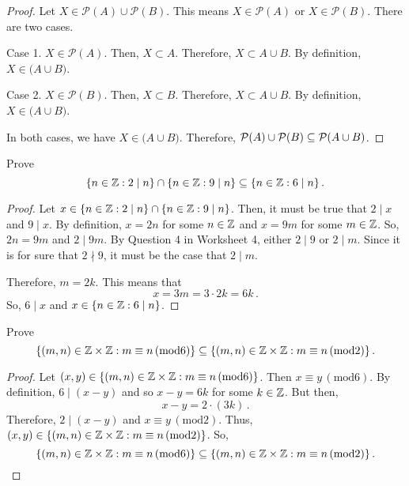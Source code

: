 \documentclass[12pt]{amsart}
\begin{document}
\begin{proof}
	Let $X \in \mathcal{P}(A) \cup \mathcal{P}(B)$.
	This means $X \in \mathcal{P}(A)$ or $X \in \mathcal{P}(B)$.
	There are two cases.

	Case 1. $X \in \mathcal{P}(A)$. Then, $X \subset A$.
	Therefore, $X \subset A \cup B$.
	By definition, $X \in \mathcal(A \cup B)$.

	Case 2. $X \in \mathcal{P}(B)$. Then, $X \subset B$.
	Therefore, $X \subset A \cup B$.
	By definition, $X \in \mathcal(A \cup B)$.

	In both cases, we have $X \in \mathcal(A \cup B)$.
	Therefore,
	$ \mathcal{P}(A) \cup \mathcal{P}(B) \subseteq \mathcal{P}(A \cup B)$.
\end{proof}

\begin{problem}[Exercise 3.21]
Prove
\begin{equation*}
	\{ n\in \mathbb{Z} : 2 \mid n \} \cap \{ n \in \mathbb{Z}: 9 \mid n\}
	\subseteq
	\{ n \in \mathbb{Z}: 6 \mid n \} \,.
\end{equation*}
\end{problem}

\begin{proof}
	Let $x \in  \{ n\in \mathbb{Z} : 2 \mid n \} \cap \{ n \in \mathbb{Z}: 9 \mid n\} $.
	Then, it must be true that $2 \mid x$ and $9 \mid x$.
	By definition, $x = 2n$ for some $n\in \mathbb{Z}$ and $x = 9m$ for
	some $m \in \mathbb{Z}$.
	So, $2n = 9m$ and $2 \mid 9m$.
	By Question 4 in Worksheet 4, either $2 \mid 9$ or $2 \mid m$.
	Since it is for sure that $2 \nmid 9$, it must be the case that
	$2\mid m$.

	Therefore, $m = 2k$.
	This means that
	\begin{equation*}
		x = 3m = 3\cdot 2k = 6k \,.
	\end{equation*}
	So, $6 \mid x$ and $x \in  \{ n \in \mathbb{Z}: 6 \mid n \}$.
\end{proof}

\begin{problem}[Exercise 3.22]
Prove
\begin{equation*}
	\{ (m,n) \in \mathbb{Z} \times \mathbb{Z}: m \equiv n \, (\mathrm{mod} 6) \}
	\subseteq
	\{ (m,n) \in \mathbb{Z} \times \mathbb{Z}: m \equiv n \, (\mathrm{mod} 2) \} \,.
\end{equation*}
\end{problem}

\begin{proof}
	Let $(x,y) \in \{ (m,n) \in \mathbb{Z} \times \mathbb{Z}: m \equiv n \, (\mathrm{mod} 6) \}$.
	Then $x\equiv y \, (\mathrm{mod} 6)$.
	By definition,
	$6 \mid (x - y)$ and so $x - y = 6k$ for some $k \in \mathbb{Z}$.
	But then,
	\begin{equation*}
		x - y = 2\cdot (3k) \,.
	\end{equation*}
	Therefore, $2 \mid (x-y)$ and $x \equiv y \, (\mathrm{mod} 2)$.
	Thus, $(x,y) \in
		\{ (m,n) \in \mathbb{Z} \times \mathbb{Z}: m \equiv n \, (\mathrm{mod} 2) \}$. So,
	\begin{equation*}
		\{ (m,n) \in \mathbb{Z} \times \mathbb{Z}: m \equiv n \, (\mathrm{mod} 6) \}
		\subseteq
		\{ (m,n) \in \mathbb{Z} \times \mathbb{Z}: m \equiv n \, (\mathrm{mod} 2) \} \,.
	\end{equation*}
\end{proof}

%
%
\end{document}
